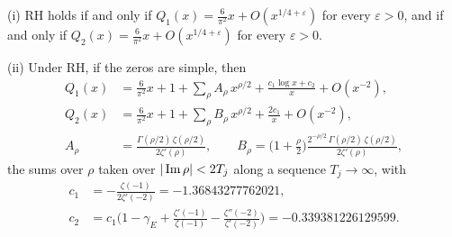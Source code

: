 \begin{theorem}\label{thm:sqfree:smooth}
\textup{(i)} RH holds if and only if $Q_1(x)=\frac6{\pi^2}x+O(x^{1/4+\varepsilon})$ for every $\varepsilon>0$, and if and only if $Q_2(x)=\frac6{\pi^2}x+O(x^{1/4+\varepsilon})$ for every $\varepsilon>0$.

\textup{(ii)} Under RH, if the zeros are simple, then
\begin{align*}
Q_1(x)&=\frac6{\pi^2}x+1+\sum_\rho A_\rho\,x^{\rho/2}+\frac{c_1\log x+c_2}x+O(x^{-2}),\\
Q_2(x)&=\frac6{\pi^2}x+1+\sum_\rho B_\rho\,x^{\rho/2}+\frac{2c_1}x+O(x^{-2}),\\
A_\rho&=\frac{\Gamma(\rho/2)\,\zeta(\rho/2)}{2\zeta'(\rho)},\qquad B_\rho=\Big(1+\frac\rho2\Big)\frac{2^{-\rho/2}\,\Gamma(\rho/2)\,\zeta(\rho/2)}{2\zeta'(\rho)},
\end{align*}
the sums over $\rho$ taken over $|\operatorname{Im}\rho|<2T_j$ along a sequence $T_j\to\infty$, with
\begin{align*}
c_1&=-\frac{\zeta(-1)}{2\zeta'(-2)}=-1.36843277762021,\\
c_2&=c_1\Big(1-\gamma_E+\frac{\zeta'(-1)}{\zeta(-1)}-\frac{\zeta''(-2)}{\zeta'(-2)}\Big)=-0.339381226129599 .
\end{align*}
\end{theorem}

